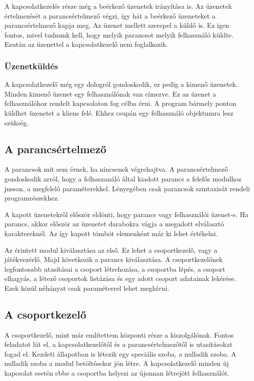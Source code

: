 \documentclass[bibliography=totocnumbered]{article}
\begin{document}
A kapcsolatkezelés része még a beérkező üzenetek irányítása is. Az
üzenetek értelmezését a parancsértelmező végzi, így hát a beérkező
üzeneteket a parancsértelmező kapja meg. Az üzenet mellett szerepel a
küldő is. Ez igen fontos, mivel tudnunk kell, hogy melyik parancsot
melyik felhasználó küldte. Ezután az üzenettel a kapcsolatkezelő nem
foglalkozik.


\subsubsection{Üzenetküldés}

A kapcsolatkezelő még egy dologról gondoskodik, ez pedig a kimenő
üzenetek. Minden kimenő üzenet egy felhasználónak van címezve. Ez az
üzenet a felhasználóhoz rendelt kapcsolaton fog célba érni. A program
bármely ponton küldhet üzenetet a kliens felé. Ehhez csupán egy
felhasználó objektumra lesz szükség.


\subsection{A parancsértelmező}

A parancsok mit sem érnek, ha nincsenek végrehajtva. A parancsértelmező
gondoskodik arról, hogy a felhaszanáló által kiadott parancs a felelős
modulhoz jusson, a megfelelő paraméterekkel. Lényegében csak parancsok
szintaxisát rendeli programrészekhez.

A kapott üzenetekről először eldönti, hogy parancs vagy felhasználói
üzenet-e. Ha parancs, akkor először az üzenetet darabokra vágja a
megadott elválasztó karaktereknél. Az így kapott tömböt elemenként már
ki lehet értékelni.

Az érintett modul kiválasztása az első. Ez lehet a csoportkezelő, vagy a
játékvezérlő. Majd következik a parancs kiválasztása. A csoportkezelőnek
legfontosabb utasításai a csoport létrehozása, a csoportba lépés, a
csoport elhagyás, a létező csoportok listázása és egy adott csoport
adatainak lekérése. Ezek közül néhányat csak paraméterrel lehet
meghívni.


\subsection{A csoportkezelő}

A csoportkezelő, mint már említettem központi része a kiszolgálónak.
Fontos feladatot lát el, a kapcsolatkezelőtől és a parancsértelmezőtől
is utasításokat fogad el. Kezdeti állapotban is létezik egy speciális
szoba, a nulladik szoba. A nulladik szoba a modul betöltésekor jön
létre. A kapcsolatkezelő minden új kapcsolat esetén ebbe a csoportba
helyezi az újonnan létrejött felhasználót.
\end{document}
